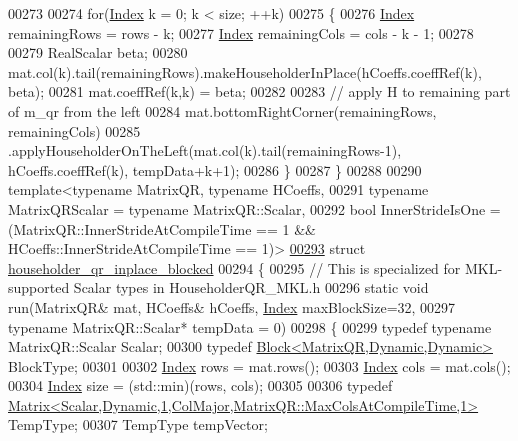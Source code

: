 \begin{DoxyCode}
00273 
00274   \textcolor{keywordflow}{for}(\hyperlink{namespace_eigen_a62e77e0933482dafde8fe197d9a2cfde}{Index} k = 0; k < size; ++k)
00275   \{
00276     \hyperlink{namespace_eigen_a62e77e0933482dafde8fe197d9a2cfde}{Index} remainingRows = rows - k;
00277     \hyperlink{namespace_eigen_a62e77e0933482dafde8fe197d9a2cfde}{Index} remainingCols = cols - k - 1;
00278 
00279     RealScalar beta;
00280     mat.col(k).tail(remainingRows).makeHouseholderInPlace(hCoeffs.coeffRef(k), beta);
00281     mat.coeffRef(k,k) = beta;
00282 
00283     \textcolor{comment}{// apply H to remaining part of m\_qr from the left}
00284     mat.bottomRightCorner(remainingRows, remainingCols)
00285         .applyHouseholderOnTheLeft(mat.col(k).tail(remainingRows-1), hCoeffs.coeffRef(k), tempData+k+1);
00286   \}
00287 \}
00288 
00290 \textcolor{keyword}{template}<\textcolor{keyword}{typename} MatrixQR, \textcolor{keyword}{typename} HCoeffs,
00291   \textcolor{keyword}{typename} MatrixQRScalar = \textcolor{keyword}{typename} MatrixQR::Scalar,
00292   \textcolor{keywordtype}{bool} InnerStrideIsOne = (MatrixQR::InnerStrideAtCompileTime == 1 && HCoeffs::InnerStrideAtCompileTime == 
      1)>
\hyperlink{struct_eigen_1_1internal_1_1householder__qr__inplace__blocked}{00293} \textcolor{keyword}{struct} \hyperlink{struct_eigen_1_1internal_1_1householder__qr__inplace__blocked}{householder\_qr\_inplace\_blocked}
00294 \{
00295   \textcolor{comment}{// This is specialized for MKL-supported Scalar types in HouseholderQR\_MKL.h}
00296   \textcolor{keyword}{static} \textcolor{keywordtype}{void} run(MatrixQR& mat, HCoeffs& hCoeffs, \hyperlink{namespace_eigen_a62e77e0933482dafde8fe197d9a2cfde}{Index} maxBlockSize=32,
00297       \textcolor{keyword}{typename} MatrixQR::Scalar* tempData = 0)
00298   \{
00299     \textcolor{keyword}{typedef} \textcolor{keyword}{typename} MatrixQR::Scalar Scalar;
00300     \textcolor{keyword}{typedef} \hyperlink{group___core___module_class_eigen_1_1_block}{Block<MatrixQR,Dynamic,Dynamic>} BlockType;
00301 
00302     \hyperlink{namespace_eigen_a62e77e0933482dafde8fe197d9a2cfde}{Index} rows = mat.rows();
00303     \hyperlink{namespace_eigen_a62e77e0933482dafde8fe197d9a2cfde}{Index} cols = mat.cols();
00304     \hyperlink{namespace_eigen_a62e77e0933482dafde8fe197d9a2cfde}{Index} size = (std::min)(rows, cols);
00305 
00306     \textcolor{keyword}{typedef} \hyperlink{group___core___module_class_eigen_1_1_matrix}{Matrix<Scalar,Dynamic,1,ColMajor,MatrixQR::MaxColsAtCompileTime,1>}
       TempType;
00307     TempType tempVector;

\end{DoxyCode}
